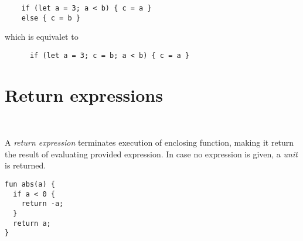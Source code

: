 \begin{example}
\begin{lstlisting}
    if (let a = 3; a < b) { c = a } 
    else { c = b }
\end{lstlisting}
\end{example}

\begin{center}
  which is equivalet to
\end{center}

\begin{example}
  \begin{lstlisting}
      if (let a = 3; c = b; a < b) { c = a } 
  \end{lstlisting}
  \end{example}

\section{Return expressions}

\begin{bnf}
   \eq {} \ 
\end{bnf}

A \emph{return expression} terminates execution of enclosing function, making it return the result of evaluating provided expression. In case no expression is given, a \emph{unit} is returned.

\begin{example}
\begin{lstlisting}
fun abs(a) {
  if a < 0 {
    return -a;
  }
  return a;
}
\end{lstlisting}
\end{example}
